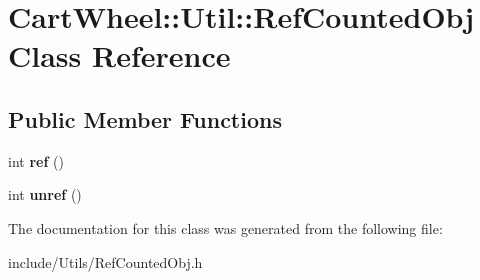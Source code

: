 \hypertarget{classCartWheel_1_1Util_1_1RefCountedObj}{
\section{CartWheel::Util::RefCountedObj Class Reference}
\label{classCartWheel_1_1Util_1_1RefCountedObj}
}
\subsection*{Public Member Functions}
\begin{DoxyCompactItemize}
\item 
\hypertarget{classCartWheel_1_1Util_1_1RefCountedObj_aa5647a25d9220d47b54d69fc1b927b3a}{
int {\bfseries ref} ()}
\label{classCartWheel_1_1Util_1_1RefCountedObj_aa5647a25d9220d47b54d69fc1b927b3a}

\item 
\hypertarget{classCartWheel_1_1Util_1_1RefCountedObj_a5b4e635c9a6bddf3745320ad62998664}{
int {\bfseries unref} ()}
\label{classCartWheel_1_1Util_1_1RefCountedObj_a5b4e635c9a6bddf3745320ad62998664}

\end{DoxyCompactItemize}


The documentation for this class was generated from the following file:\begin{DoxyCompactItemize}
\item 
include/Utils/RefCountedObj.h\end{DoxyCompactItemize}
